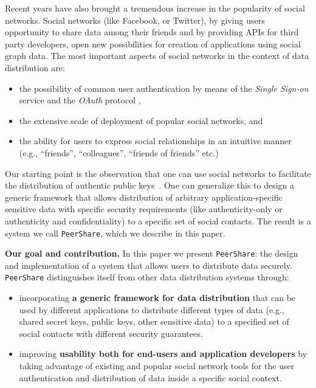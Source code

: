 \documentclass[twocolumn,a4paper,10pt]{article}
\newcommand{\peershare}{\texttt{PeerShare}\xspace}
\begin{document}
Recent years have also brought a tremendous increase in the popularity of social networks. Social networks (like Facebook\cite{Facebook}, or Twitter\cite{Twitter}), by giving users opportunity to share data among their friends and by providing APIs for third party developers, open new possibilities for creation of applications using social graph data. The most important aspects of social networks in the context of data distribution are:
\begin{itemize}
\item the possibility of common user authentication by means of the \emph{Single Sign-on} service and the \emph{OAuth} protocol \cite{rfc6749},
\item the extensive scale of deployment of popular social networks, and
\item the ability for users to express social relationships in an intuitive manner (e.g., ``friends'', ``colleagues'', ``friends of friends'' etc.)
\end{itemize}

Our starting point is the observation that one can use social networks to facilitate the distribution of authentic public keys~\cite{socialkeys}.  One can generalize this to design a generic framework that allows distribution of arbitrary application-specific sensitive data with specific security requirements (like authenticity-only or authenticity and confidentiality) to a specific set of social contacts.  The result is a system we call \peershare, which we describe in this paper.

\textbf{Our goal and contribution.} In this paper we present \peershare: the design and implementation of a system that allows users to distribute data securely. \peershare distinguishes itself from other data distribution systems through:
\begin{itemize}
\item incorporating \textbf{a generic framework for data distribution} that can be used by different applications to distribute different types of data (e.g., shared secret keys, public keys, other sensitive data) to a specified set of social contacts with different security guarantees. 
\item improving \textbf{usability both for end-users and application developers} by taking advantage of existing and popular social network tools for the user authentication and distribution of data inside a specific social context.
\end{itemize}
\end{document}
